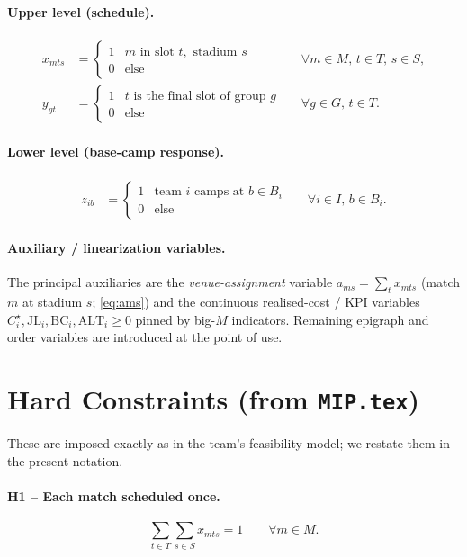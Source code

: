 \documentclass[12pt, letterpaper]{article}
\begin{document}
\paragraph{Upper level (schedule).}
\begin{align}
x_{mts} &=
  \begin{cases} 1 & m \text{ in slot } t,\text{ stadium } s\\ 0 &
  \text{else}\end{cases}
  &&\forall m\in M,\,t\in T,\,s\in S,\\
y_{gt} &=
  \begin{cases} 1 & t \text{ is the final slot of group } g\\ 0 &
  \text{else}\end{cases}
  &&\forall g\in G,\,t\in T.
\end{align}

\paragraph{Lower level (base-camp response).}
\begin{align}
z_{ib} &=
  \begin{cases} 1 & \text{team } i \text{ camps at } b\in B_i\\ 0 &
  \text{else}\end{cases}
  &&\forall i\in I,\,b\in B_i.
\end{align}

\paragraph{Auxiliary / linearization variables.}
The principal auxiliaries are the \emph{venue-assignment} variable
$a_{ms}=\sum_t x_{mts}$ (match $m$ at stadium $s$; \eqref{eq:ams}) and the
continuous realised-cost / KPI variables $C_i^\star,\mathrm{JL}_i,
\mathrm{BC}_i,\mathrm{ALT}_i\ge0$ pinned by big-$M$ indicators. Remaining
epigraph and order variables are introduced at the point of use.

\section{Hard Constraints (from \texttt{MIP.tex})}

These are imposed exactly as in the team's feasibility model; we restate
them in the present notation.

\paragraph{H1 -- Each match scheduled once.}
\begin{equation}
\sum_{t\in T}\sum_{s\in S} x_{mts}=1 \qquad\forall m\in M.
\end{equation}
\end{document}
